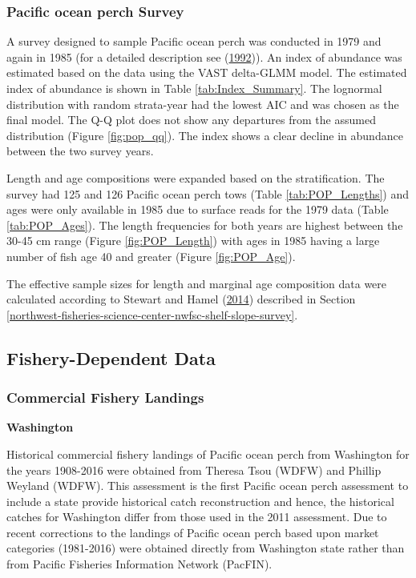 \documentclass[12pt,]{article}
\begin{document}
\subsubsection{Pacific ocean perch
Survey}\label{pacific-ocean-perch-survey}

A survey designed to sample Pacific ocean perch was conducted in 1979
and again in 1985 (for a detailed description see
(\protect\hyperlink{ref-ianelli_status_1992}{1992})). An index of
abundance was estimated based on the data using the VAST delta-GLMM
model. The estimated index of abundance is shown in Table
\ref{tab:Index_Summary}. The lognormal distribution with random
strata-year had the lowest AIC and was chosen as the final model. The
Q-Q plot does not show any departures from the assumed distribution
(Figure \ref{fig:pop_qq}). The index shows a clear decline in abundance
between the two survey years.

Length and age compositions were expanded based on the stratification.
The survey had 125 and 126 Pacific ocean perch tows (Table
\ref{tab:POP_Lengths}) and ages were only available in 1985 due to
surface reads for the 1979 data (Table \ref{tab:POP_Ages}). The length
frequencies for both years are highest between the 30-45 cm range
(Figure \ref{fig:POP_Length}) with ages in 1985 having a large number of
fish age 40 and greater (Figure \ref{fig:POP_Age}).

The effective sample sizes for length and marginal age composition data
were calculated according to Stewart and Hamel
(\protect\hyperlink{ref-stewart_bootstrapping_2014}{2014}) described in
Section
\ref{northwest-fisheries-science-center-nwfsc-shelf-slope-survey}.

\subsection{Fishery-Dependent Data}\label{fishery-dependent-data}

\subsubsection{Commercial Fishery
Landings}\label{commercial-fishery-landings}

\textbf{Washington}

Historical commercial fishery landings of Pacific ocean perch from
Washington for the years 1908-2016 were obtained from Theresa Tsou
(WDFW) and Phillip Weyland (WDFW). This assessment is the first Pacific
ocean perch assessment to include a state provide historical catch
reconstruction and hence, the historical catches for Washington differ
from those used in the 2011 assessment. Due to recent corrections to the
landings of Pacific ocean perch based upon market categories (1981-2016)
were obtained directly from Washington state rather than from Pacific
Fisheries Information Network (PacFIN).
\end{document}
